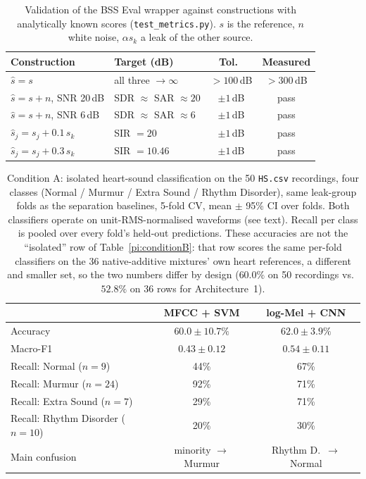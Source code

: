 \documentclass[conference]{IEEEtran}
\begin{document}
\begin{table}[htbp]
\centering
\caption{Validation of the BSS Eval wrapper against constructions with analytically known scores (\texttt{test\_metrics.py}). $s$ is the reference, $n$ white noise, $\alpha s_k$ a leak of the other source.}
\label{pi:metricsval}
\footnotesize
\begin{tabular}{@{}llcc@{}}
\toprule
Construction & Target (dB) & Tol.\ & Measured \\
\midrule
$\hat s = s$ & all three $\to\infty$ & $>100$\,dB & $>300$\,dB \\
$\hat s = s + n$, SNR 20\,dB & SDR $\approx$ SAR $\approx 20$ & $\pm1$\,dB & pass \\
$\hat s = s + n$, SNR 6\,dB & SDR $\approx$ SAR $\approx 6$ & $\pm1$\,dB & pass \\
$\hat s_j = s_j + 0.1\,s_k$ & SIR $= 20$ & $\pm1$\,dB & pass \\
$\hat s_j = s_j + 0.3\,s_k$ & SIR $= 10.46$ & $\pm1$\,dB & pass \\
\bottomrule
\end{tabular}
\end{table}

\begin{table}[htbp]
\centering
\caption{Condition A: isolated heart-sound classification on the 50 \texttt{HS.csv} recordings, four classes (Normal / Murmur / Extra Sound / Rhythm Disorder), same leak-group folds as the separation baselines, 5-fold CV, mean $\pm$ 95\% CI over folds. Both classifiers operate on unit-RMS-normalised waveforms (see text). Recall per class is pooled over every fold's held-out predictions. These accuracies are not the ``isolated'' row of Table~\ref{pi:conditionB}: that row scores the same per-fold classifiers on the 36 native-additive mixtures' own heart references, a different and smaller set, so the two numbers differ by design ($60.0\%$ on 50 recordings vs.\ $52.8\%$ on 36 rows for Architecture~1).}
\label{pi:conditionA}
\footnotesize
\begin{tabular}{@{}lcc@{}}
\toprule
 & MFCC + SVM & log-Mel + CNN \\
\midrule
Accuracy & $60.0 \pm 10.7\%$ & $62.0 \pm 3.9\%$ \\
Macro-F1 & $0.43 \pm 0.12$ & $0.54 \pm 0.11$ \\
\midrule
Recall: Normal ($n{=}9$) & 44\% & 67\% \\
Recall: Murmur ($n{=}24$) & 92\% & 71\% \\
Recall: Extra Sound ($n{=}7$) & 29\% & 71\% \\
Recall: Rhythm Disorder ($n{=}10$) & 20\% & 30\% \\
Main confusion & minority $\to$ Murmur & Rhythm D.\ $\to$ Normal \\
\bottomrule
\end{tabular}
\end{table}
\end{document}
